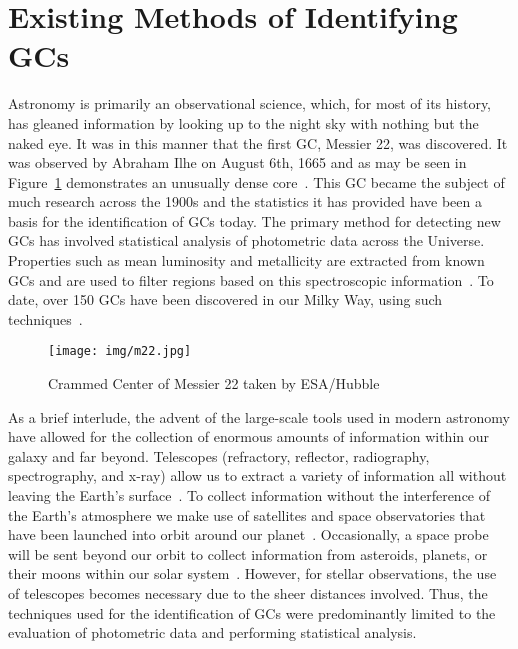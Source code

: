 \section{Existing Methods of Identifying GCs}

Astronomy is primarily an observational science, which, for most of its history, has gleaned information by looking up to the night sky with nothing but the naked eye. It was in this manner that the first GC, Messier 22,  was discovered. It was observed by Abraham Ilhe on August 6th, 1665 and as may be seen in Figure~\ref{fig:gc-m22} demonstrates an unusually dense core~\cite{Monaco2004}. This GC became the subject of much research across the 1900s and the statistics it has provided have been a basis for the identification of GCs today. The primary method for detecting new GCs has involved statistical analysis of photometric data across the Universe. Properties such as mean luminosity and metallicity are extracted from known GCs and are used to filter regions based on this spectroscopic information~\cite{gc-detection-old-1, Lee334}. To date, over 150 GCs have been discovered in our Milky Way, using such techniques~\cite{Harris2010}.

\begin{figure}[H]
    \centering
    \texttt{[image: img/m22.jpg]}
    \caption{\label{fig:gc-m22} Crammed Center of Messier 22 taken by ESA/Hubble~\cite{wikimedia-gc-m22}}
\end{figure}

As a brief interlude, the advent of the large-scale tools used in modern astronomy have allowed for the collection of enormous amounts of information within our galaxy and far beyond. Telescopes (refractory, reflector, radiography, spectrography, and x-ray) allow us to extract a variety of information all without leaving the Earth's surface~\cite{Yuan-SenTing2014}. To collect information without the interference of the Earth's atmosphere we make use of satellites and space observatories that have been launched into orbit around our planet~\cite{8thGradeScience}. Occasionally, a space probe will be sent beyond our orbit to collect information from asteroids, planets, or their moons within our solar system~\cite{8thGradeScience}. However, for stellar observations, the use of telescopes becomes necessary due to the sheer distances involved. Thus, the techniques used for the identification of GCs were predominantly limited to the evaluation of photometric data and performing statistical analysis.

